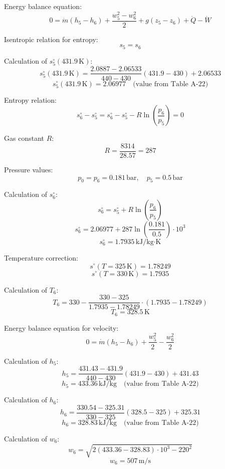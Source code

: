 Energy balance equation:  
\[
0 = \dot{m} (h_5 - h_6) + \frac{w_5^2 - w_6^2}{2} + g(z_5 - z_6) + \dot{Q} - \dot{W}
\]  

Isentropic relation for entropy:  
\[
s_5 = s_6
\]  

Calculation of \( s_5^\circ(431.9 \, \text{K}) \):  
\[
s_5^\circ(431.9 \, \text{K}) = \frac{2.0887 - 2.06533}{440 - 430} (431.9 - 430) + 2.06533
\]  
\[
s_5^\circ(431.9 \, \text{K}) = 2.06977 \quad \text{(value from Table A-22)}
\]  

Entropy relation:  
\[
s_6^\circ - s_5^\circ = s_6^\circ - s_5^\circ - R \ln \left( \frac{p_6}{p_5} \right) = 0
\]  

Gas constant \( R \):  
\[
R = \frac{8314}{28.57} = 287
\]  

Pressure values:  
\[
p_0 = p_6 = 0.181 \, \text{bar}, \quad p_5 = 0.5 \, \text{bar}
\]  

Calculation of \( s_6^\circ \):  
\[
s_6^\circ = s_5^\circ + R \ln \left( \frac{p_6}{p_5} \right)
\]  
\[
s_6^\circ = 2.06977 + 287 \ln \left( \frac{0.181}{0.5} \right) \cdot 10^3
\]  
\[
s_6^\circ = 1.7935 \, \text{kJ/kg·K}
\]  

Temperature correction:  
\[
s^\circ(T = 325 \, \text{K}) = 1.78249
\]  
\[
s^\circ(T = 330 \, \text{K}) = 1.7935
\]  

Calculation of \( T_6 \):  
\[
T_6 = 330 - \frac{330 - 325}{1.7935 - 1.78249} \cdot (1.7935 - 1.78249)
\]  
\[
T_6 = 328.5 \, \text{K}
\]  

Energy balance equation for velocity:  
\[
0 = \dot{m} (h_5 - h_6) + \frac{w_5^2}{2} - \frac{w_6^2}{2}
\]  

Calculation of \( h_5 \):  
\[
h_5 = \frac{431.43 - 431.9}{440 - 430} (431.9 - 430) + 431.43
\]  
\[
h_5 = 433.36 \, \text{kJ/kg} \quad \text{(value from Table A-22)}
\]  

Calculation of \( h_6 \):  
\[
h_6 = \frac{330.54 - 325.31}{330 - 325} (328.5 - 325) + 325.31
\]  
\[
h_6 = 328.83 \, \text{kJ/kg} \quad \text{(value from Table A-22)}
\]  

Calculation of \( w_6 \):  
\[
w_6 = \sqrt{2 \left( 433.36 - 328.83 \right) \cdot 10^3 - 220^2}
\]  
\[
w_6 = 507 \, \text{m/s}
\]